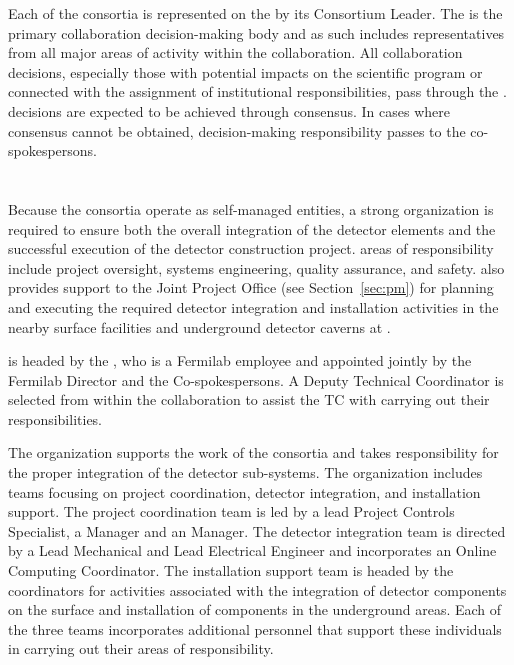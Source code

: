 Each of the consortia is represented on the   by
its Consortium Leader.  The   is the primary
collaboration decision-making body and as such includes
representatives from all major areas of activity within the
collaboration.  All collaboration decisions, especially those with
potential impacts on the  scientific program or connected with the
assignment of institutional responsibilities, pass through the
.   decisions are expected to be
achieved through consensus.  In cases where consensus cannot be
obtained, decision-making responsibility passes to the
co-spokespersons.

\section{}
\label{sec:tc}

Because the consortia operate as self-managed entities, a strong
 organization is required to ensure both the
overall integration of the detector elements and the successful
execution of the detector construction project.  
areas of responsibility include project oversight,
systems engineering, quality assurance, and safety.  
also provides support to the Joint Project Office (see
Section~\ref{sec:pm}) for planning and executing the required detector
integration and installation activities in the nearby surface
facilities and underground detector caverns at \surf.

  is headed by the , who is a
Fermilab employee and appointed jointly by the Fermilab Director and
the  Co-spokespersons.  A Deputy Technical Coordinator is
selected from within the collaboration to assist the TC with carrying
out their responsibilities.

The  organization supports the work of the consortia and
takes responsibility for the proper integration of the detector
sub-systems.  The organization includes teams focusing on project
coordination, detector integration, and installation support.  The
project coordination team is led by a lead Project Controls
Specialist, a  Manager and an  Manager.  The
detector integration team is directed by a Lead Mechanical and Lead
Electrical Engineer and incorporates an Online Computing Coordinator.
The installation support team is headed by the coordinators for
activities associated with the integration of detector components on
the surface and installation of components in the underground areas.
Each of the three teams incorporates additional personnel that support
these individuals in carrying out their areas of responsibility.

